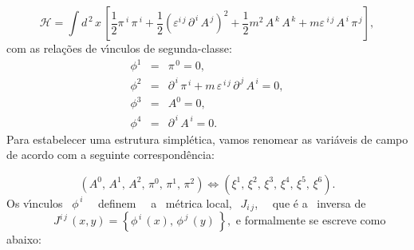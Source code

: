 \documentclass[a4paper,thmsa,12pt]{report}
\begin{document}
\begin{equation}
\mathcal{H}=\int d^{\,2}\,x\,\left[ \frac{1}{2}\pi \,^{i}\,\pi \,^{i}+\frac{1%
}{2}\left( \varepsilon ^{i\,j}\,\partial ^{\,i}\,A^{\,j}\right) ^{2}+\frac{1%
}{2}m^{2}\,A^{\,k}\,A^{\,k}+m\varepsilon \,^{i\,j}\,A^{\,i}\,\pi ^{\,j}%
\right] ,  \label{328}
\end{equation}
com as rela\c{c}\~{o}es de v\'{\i}nculos de segunda-classe:
\begin{eqnarray}
\phi ^{1}&=&\pi ^{\,0}=0,  \label{329}\\
\phi ^{2}&=&\partial ^{\,i}\,\pi ^{\,i}+m\,\varepsilon ^{\,i\,j}\,\partial
^{\,j}\,A^{\,i}=0,  \label{330}\\
\phi ^{3}&=&A^{0}=0,  \label{331}\\
\phi ^{4}&=&\partial ^{\,i}\,A^{\,i}=0.  \label{332}
\end{eqnarray}
\medskip Para estabelecer uma estrutura simpl\'{e}tica, vamos renomear as
vari\'{a}veis de campo de acordo com a seguinte correspond\^{e}ncia:

\begin{equation}
\left( A^{0},\,A^{1},\,A^{2},\,\pi ^{0},\,\pi ^{1},\,\pi ^{2}\right)
\Leftrightarrow \left( \xi ^{1},\,\xi ^{2},\,\xi ^{3},\,\xi ^{4},\,\xi
^{5},\,\xi ^{6}\right) .  \label{333}
\end{equation}
\medskip Os v\'{\i}nculos \ $\phi ^{\,i}$ \ \ definem \ \ a \ m\'{e}trica
local, $\ \ J_{i\,j}$, \ \ que \'{e} a \ inversa de \ \ \ \ \ \ \
\smallskip\ $\ J^{i\,j}\,\left( x,y\right) =\left\{ \phi ^{\,i}\,\left(
x\right) ,\,\phi ^{\,j}\,\left( y\right) \,\right\} ,$ e formalmente se
escreve como abaixo:
\end{document}
